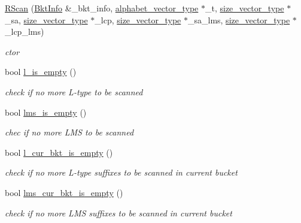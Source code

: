 \begin{DoxyCompactItemize}
\item 
\hyperlink{struct_validate4_1_1_r_scan_a278507de57d05bc31a364a632f3a38ab}{R\+Scan} (\hyperlink{struct_validate4_1_1_bkt_info}{Bkt\+Info} \&\+\_\+bkt\+\_\+info, \hyperlink{class_validate4_a49c80b3d101be19542a4341c2387603a}{alphabet\+\_\+vector\+\_\+type} $\ast$\+\_\+t, \hyperlink{class_validate4_a46ea31a0a4b23f583806792160421d15}{size\+\_\+vector\+\_\+type} $\ast$\+\_\+sa, \hyperlink{class_validate4_a46ea31a0a4b23f583806792160421d15}{size\+\_\+vector\+\_\+type} $\ast$\+\_\+lcp, \hyperlink{class_validate4_a46ea31a0a4b23f583806792160421d15}{size\+\_\+vector\+\_\+type} $\ast$\+\_\+sa\+\_\+lms, \hyperlink{class_validate4_a46ea31a0a4b23f583806792160421d15}{size\+\_\+vector\+\_\+type} $\ast$\+\_\+lcp\+\_\+lms)
\begin{DoxyCompactList}\small\item\em ctor \end{DoxyCompactList}\item 
bool \hyperlink{struct_validate4_1_1_r_scan_aee1dcbd2edf03def6f3b3954d5cf0871}{l\+\_\+is\+\_\+empty} ()
\begin{DoxyCompactList}\small\item\em check if no more L-\/type to be scanned \end{DoxyCompactList}\item 
bool \hyperlink{struct_validate4_1_1_r_scan_ad24066012dd9441ffab435ce3f02424e}{lms\+\_\+is\+\_\+empty} ()
\begin{DoxyCompactList}\small\item\em chec if no more L\+MS to be scanned \end{DoxyCompactList}\item 
bool \hyperlink{struct_validate4_1_1_r_scan_adf0c72967eddde6a6924472a16e92e95}{l\+\_\+cur\+\_\+bkt\+\_\+is\+\_\+empty} ()
\begin{DoxyCompactList}\small\item\em check if no more L-\/type suffixes to be scanned in current bucket \end{DoxyCompactList}\item 
bool \hyperlink{struct_validate4_1_1_r_scan_a67647b0b0ef9df76bdcfa85547296a33}{lms\+\_\+cur\+\_\+bkt\+\_\+is\+\_\+empty} ()
\begin{DoxyCompactList}\small\item\em check if no more L\+MS suffixes to be scanned in current bucket \end{DoxyCompactList}\item 

\end{DoxyCompactItemize}
